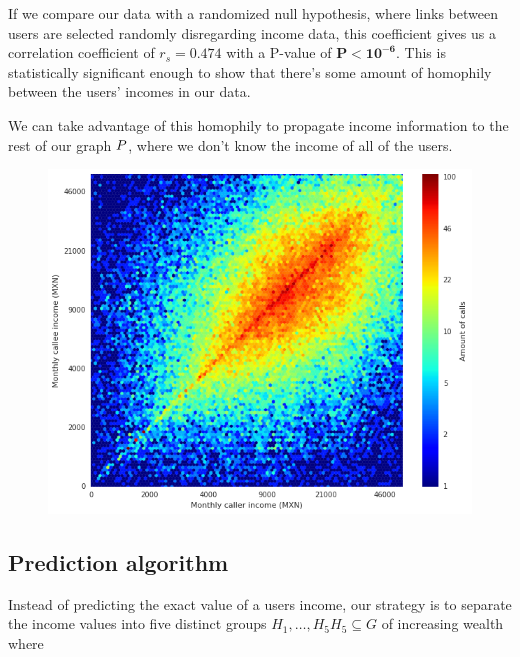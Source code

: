 If we compare our data with a randomized null hypothesis, where links between users are selected randomly disregarding income data, this coefficient gives us a correlation coefficient of $r_s = \mathbf{0.474} $ with a P-value of $ \mathbf{P < 10^{-6}} $. This is statistically significant enough to show that there's some amount of homophily between the users' incomes in our data.

We can take advantage of this homophily to propagate income information to the rest of our graph $ \mathlarger{P} $, where we don't know the income of all of the users.

\begin{figure}[h]
\begin{center}
\includegraphics[width=1\columnwidth]{figures/Homophily_income_origin_target_1/Homophily_income_origin_target_1.png}
\caption{ \protect}
\label{homophily_heatmap}
\end{center}
\end{figure}

\subsection{Prediction algorithm}

Instead of predicting the exact value of a users income, our strategy is to separate the income values into five distinct groups $ H_1, \ldots, H_5 H_5 \subseteq G$ of increasing wealth where


